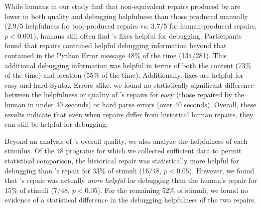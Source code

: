  While humans in our study find that non-equivalent
repairs produced by \toolname are lower in both quality and debugging
helpfulness than those produced manually (2.9/5 helpfulness for tool-produced
repairs vs. 3.7/5 for human-produced repairs, $p < 0.001$), humans still often
find \toolname's fixes helpful for debugging. Participants found that \toolname
repairs contained helpful debugging information beyond that contained in the
Python Error message 48\% of the time (134/281). This additional debugging
information was helpful in terms of both the content (73\% of the time) and
location (55\% of the time). Additionally, \toolname fixes are helpful for easy
and hard Syntax Errors alike: we found no statistically-significant difference
between the helpfulness or quality of \toolname's repairs for easy (those
repaired by the human in under 40 seconds) or hard parse errors (over 40
seconds).
Overall, these results indicate that even when \toolname repairs differ from
historical human repairs, they can still be helpful for debugging.

 Beyond an analysis of \toolname's overall quality, we also
analyze the helpfulness of each stimulus. %
Of the 48 programs for which we collected sufficient data to permit statistical
comparison, the historical repair was statistically more helpful for debugging
than \toolname's repair for 33\% of stimuli (16/48, $p<0.05$). However, we found
that \toolname's repair was actually \emph{more helpful} for debugging than the
human's repair for 15\% of stimuli (7/48, $p<0.05$). For the remaining 52\% of
stimuli, we found no evidence of a statistical difference in the debugging
helpfulness of the two repairs.

